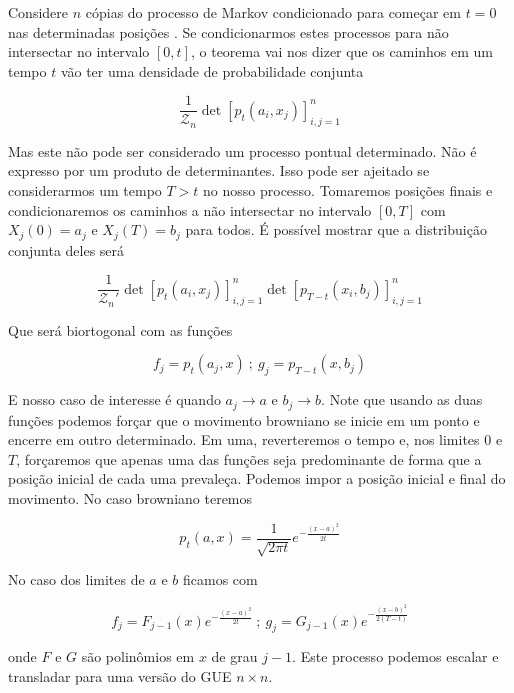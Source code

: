 Considere $n$ cópias do processo de Markov condicionado para começar em $t=0$ nas determinadas posições . Se condicionarmos estes processos para não intersectar no intervalo $[0,t]$, o teorema vai nos dizer que os caminhos em um tempo $t$ vão ter uma densidade de probabilidade conjunta

\[
	\frac{1}{\mathcal{Z}_n} \det{[p_t(a_i, x_j)]^{n}_{i,j=1}}
\]

Mas este não pode ser considerado um processo pontual determinado. Não é expresso por um produto de determinantes. Isso pode ser ajeitado se considerarmos um tempo $T > t$ no nosso processo. Tomaremos  posições finais e condicionaremos os caminhos a não intersectar no intervalo $[0, T]$ com $X_j(0) = a_j$ e $X_j(T) = b_j$ para todos. É possível mostrar que a distribuição conjunta deles será

\[
	\frac{1}{\mathcal{Z}_n'} \det{[p_t(a_i, x_j)]^{n}_{i,j=1}} \det{[p_{T-t}(x_i, b_j)]^{n}_{i,j=1}}
\]

Que será biortogonal com as funções

\[
	f_j = p_t(a_j, x) \ ; \ g_j = p_{T-t}(x, b_j)
\]

E nosso caso de interesse é quando $a_j \rightarrow a$ e $b_j \rightarrow b$. Note que usando as duas funções podemos forçar que o movimento browniano se inicie em um ponto e encerre em outro determinado. Em uma, reverteremos o tempo e, nos limites $0$ e $T$, forçaremos que apenas uma das funções seja predominante de forma que a posição inicial de cada uma prevaleça. Podemos impor a posição inicial e final do movimento. No caso browniano teremos

\[
	p_t(a, x) = \frac{1}{\sqrt{2\pi t}} e^{-\frac{(x-a)^2}{2t}}
\]

No caso dos limites de $a$ e $b$ ficamos com

\[
	f_j = F_{j-1}(x)e^{-\frac{(x-a)^2}{2t}} \ ; \ g_j = G_{j-1}(x)e^{-\frac{(x-b)^2}{2(T-t)}}
\]

onde $F$ e $G$ são polinômios em $x$  de grau $j-1$. Este processo podemos escalar e transladar para uma versão do GUE $n \times n$.



